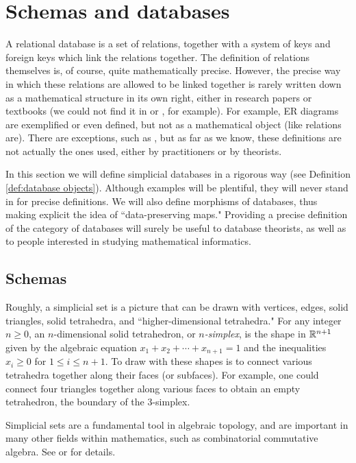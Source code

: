 \documentclass{amsart}
\begin{document}
\section{Schemas and databases}\label{sec:schemas and databases}
A relational database is a set of relations, together with a system of keys and foreign keys which link the relations together.  The definition of relations themselves is, of course, quite mathematically precise.  However, the precise way in which these relations are allowed to be linked together is rarely written down as a mathematical structure in its own right, either in research papers or textbooks (we could not find it in \cite{Dat} or \cite{EN}, for example).  For example, ER diagrams are exemplified or even defined, but not as a mathematical object (like relations are).  There are exceptions, such as \cite[2.1]{RW}, but as far as we know, these definitions are not actually the ones used, either by practitioners or by theorists.  

In this section we will define simplicial databases in a rigorous way (see Definition \ref{def:database objects}).  Although examples will be plentiful, they will never stand in for precise definitions.  We will also define morphisms of databases, thus making explicit the idea of ``data-preserving maps."  Providing a precise definition of the category of databases will surely be useful to database theorists, as well as to people interested in studying mathematical informatics.

\subsection{Schemas}\label{subsec:schemas}

Roughly, a simplicial set is a picture that can be drawn with vertices, edges, solid triangles, solid tetrahedra, and ``higher-dimensional tetrahedra."  For any integer $n\geq 0$, an $n$-dimensional solid tetrahedron, or {\em $n$-simplex}, is the shape in ${\mathbb R}^{n+1}$ given by the algebraic equation $x_1+x_2+\cdots+x_{n+1}=1$ and the inequalities $x_i\geq 0$ for $1\leq i\leq n+1$.  To draw with these shapes is to connect various tetrahedra together along their faces (or subfaces).  For example, one could connect four triangles together along various faces to obtain an empty tetrahedron, the boundary of the 3-simplex.

Simplicial sets are a fundamental tool in algebraic topology, and are important in many other fields within mathematics, such as combinatorial commutative algebra.   See \cite{Fri} or \cite{GJ} for details.
\end{document}
